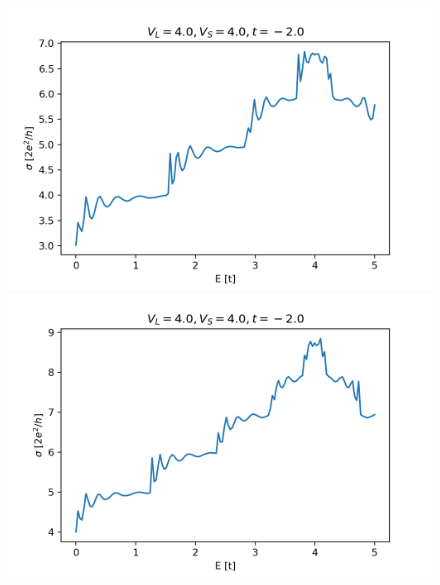 \documentclass[12pt]{article}
\numberwithin{equation}{section}
\begin{document}
\newpage
\begin{figure}
  \centering
  \begin{minipage}{0.333\textwidth}
      \centering
      \includegraphics[width=1.0\textwidth]{./media/cond_2deg_W4_L10_VL4_0_VS4_0.png} %
  \end{minipage}\hfill
  \begin{minipage}{0.333\textwidth}
      \centering
      \includegraphics[width=1.0\textwidth]{./media/cond_2deg_W5_L10_VL4_0_VS4_0.png} %
  \end{minipage}\hfill
  \begin{minipage}{0.333\textwidth}
    \centering

\end{minipage}
\end{figure}
\end{document}

